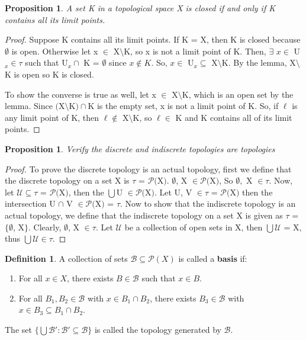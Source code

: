 \documentclass{amsart}
\theoremstyle{plain}
\newtheorem{proposition}[theorem]{Proposition}
\theoremstyle{definition}
\newtheorem{definition}[theorem]{Definition}
\theoremstyle{remark}
\begin{document}
	\begin{proposition}
		A set K in a topological space X is closed if and only if K contains all its limit points.
	\end{proposition}
	\begin{proof} Suppose K contains all its limit points.
	If K = X, then K is closed because $\emptyset$ is open.	Otherwise let x $\in$ X$\setminus$K, so x is not a limit point of K.	Then, $\exists$ $x \in$ U$_x \in \tau$ such that U$_x \cap$ K = $\emptyset$ since $x \not\in K$.	So, $x \in $ U$_x \subseteq$ X$\setminus$K.	By the lemma, X$\setminus$K is open so K is closed.

	To show the converse is true as well, let x $\in$ X$\setminus$K, which is an open set by the lemma. Since $($X$\setminus$K$)\cap$K is the empty set, x is not a limit point of K. So, if $\ell$ is any limit point of K, then $\ell \not\in$ X$\setminus$K, so $\ell \in$ K and K contains all of its limit points.
	\end{proof}

	\begin{proposition}
	Verify the discrete and indiscrete topologies are topologies
	\end{proposition}
	\begin{proof} To prove the discrete topology is an actual topology, first we define that the discrete topology on a set X is $\tau$ = $\mathcal{P}($X$)$.	$\emptyset$, X $\in \mathcal{P}($X$)$, So $\emptyset,$ X $\in \tau$. Now, let $\mathcal{U} \subseteq \tau$ = $\mathcal{P}($X$)$, then the $\bigcup$U $\in \mathcal{P}($X$)$. Let U, V $\in \tau$ = $\mathcal{P}($X$)$ then the intersection U $\cap$ V $\in \mathcal{P}($X$)$ = $\tau$. Now to show that the indiscrete topology is an actual topology, we define that the indiscrete topology on a set X is given as $\tau$ = $\lbrace \emptyset$, X$\rbrace$. Clearly, $\emptyset$, X $\in \tau$. Let $\mathcal{U}$ be a collection of open sets in X, then $\bigcup \mathcal{U}$ = X, thus $\bigcup \mathcal{U} \in \tau$.
	\end{proof}

	\begin{definition}
		A collection of sets \(\mathcal{B}\subseteq\mathcal{P}(X)\) is
		called a \textbf{basis} if:
		\begin{enumerate}
			\item For all \(x\in X\), there exists \(B\in\mathcal{B}\) such that
			\(x\in B\).
			\item  For all \(B_1,B_2 \in \mathcal{B}\) with \(x \in B_1 \cap B_2\), there exists \(B_3 \in \mathcal{B}\) with
			\(x\in B_3 \subseteq B_1 \cap B_2\).
		\end{enumerate}
	  The set \(\{\bigcup\mathcal{B}':\mathcal{B}'\subseteq\mathcal{B}\}\)
		is called the topology generated by \(\mathcal{B}\).
	\end{definition}
\end{document}
